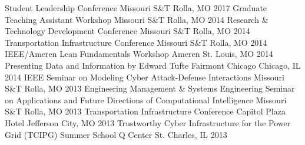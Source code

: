 \begin{cvhonors}
  \cvhonor
    {Student Leadership Conference}
    {Missouri S\&T}
    {Rolla, MO}
    {2017}
  \cvhonor
    {Graduate Teaching Assistant Workshop}
    {Missouri S\&T}
    {Rolla, MO}
    {2014}
  \cvhonor
    {Research \& Technology Development Conference}
    {Missouri S\&T}
    {Rolla, MO}
    {2014}
  \cvhonor
    {Transportation Infrastructure Conference}
    {Missouri S\&T}
    {Rolla, MO}
    {2014}
  \cvhonor
    {IEEE/Ameren Lean Fundamentals Workshop}
    {Ameren}
    {St. Louis, MO}
    {2014}
  \cvhonor
    {Presenting Data and Information by Edward Tufte}
    {Fairmont Chicago}
    {Chicago, IL}
    {2014}
  \cvhonor
    {IEEE Seminar on Modeling Cyber Attack-Defense Interactions}
    {Missouri S\&T}
    {Rolla, MO}
    {2013}
  \cvhonor
    {Engineering Management \& Systems Engineering Seminar on Applications and Future Directions of Computational Intelligence}
    {Missouri S\&T}
    {Rolla, MO}
    {2013}
  \cvhonor
    {Transportation Infrastructure Conference}
    {Capitol Plaza Hotel}
    {Jefferson City, MO}
    {2013}
  \cvhonor
    {Trustworthy Cyber Infrastructure for the Power Grid (TCIPG) Summer School}
    {Q Center}
    {St. Charles, IL}
    {2013}
\end{cvhonors} 